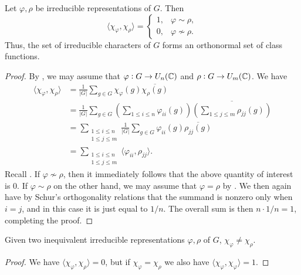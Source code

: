 		\begin{ftheo}
			Let $\varphi,\rho$ be irreducible representations of $G$. Then
			\[ \langle \chi_\varphi , \chi_\rho \rangle = \begin{cases} 1 , & \varphi \sim \rho, \\ 0 , & \varphi \not\sim \rho. \end{cases} \]
			Thus, the set of irreducible characters of $G$ forms an orthonormal set of class functions.
		\end{ftheo}
		\begin{proof}
			By , we may assume that $\varphi : G \to U_n(\mathbb{C})$ and $\rho : G \to U_m(\mathbb{C})$. We have
			\begin{align*}
				\langle \chi_\varphi , \chi_\rho \rangle &= \frac{1}{|G|} \sum_{g \in G} \chi_\varphi(g) \overline{\chi_\rho(g)} \\
					&= \frac{1}{|G|} \sum_{g \in G} \left(\sum_{1 \le i \le n} \varphi_{ii}(g)\right) \overline{\left( \sum_{1 \le j \le m} \rho_{jj}(g) \right)} \\
					&= \sum_{\substack{1 \le i \le n \\ 1 \le j \le m}} \frac{1}{|G|} \sum_{g \in G} \varphi_{ii}(g) \overline{\rho_{jj}(g)} \\
					&= \sum_{\substack{1 \le i \le n \\ 1 \le j \le m}} \langle \varphi_{ii} , \rho_{jj} \rangle.
			\end{align*}
			Recall . If $\varphi \not\sim \rho$, then it immediately follows that the above quantity of interest is $0$. If $\varphi \sim \rho$ on the other hand, we may assume that $\varphi = \rho$ by . We then again have by Schur's orthogonality relations that the summand is nonzero only when $i = j$, and in this case it is just equal to $1/n$. The overall sum is then $n \cdot 1/n = 1$, completing the proof.
		\end{proof}

		\begin{fcor}
			Given two inequivalent irreducible representations $\varphi , \rho$ of $G$, $\chi_{\varphi} \ne \chi_{\rho}$.
		\end{fcor}
		\begin{proof}
			We have $\langle \chi_\varphi , \chi_\rho \rangle = 0$, but if $\chi_\varphi = \chi_\rho$ we also have $\langle \chi_\varphi , \chi_\varphi \rangle = 1$.
		\end{proof}

